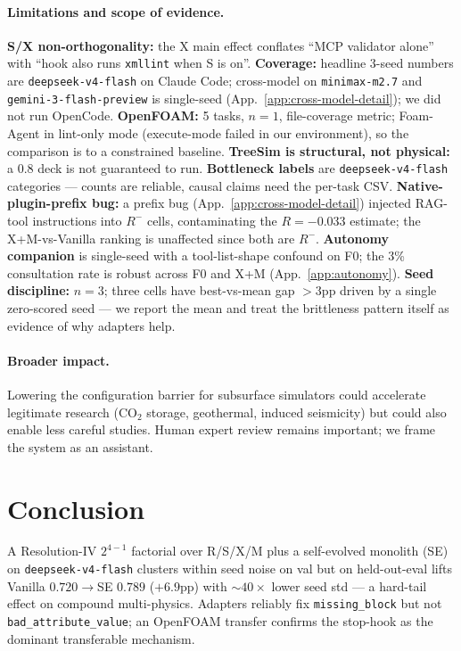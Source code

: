 \documentclass{article}
\begin{document}
\paragraph{Limitations and scope of evidence.} \textbf{S/X non-orthogonality:} the $\mathrm{X}$ main effect conflates ``MCP validator alone'' with ``hook also runs \texttt{xmllint} when S is on''. \textbf{Coverage:} headline 3-seed numbers are \texttt{deepseek-v4-flash} on Claude Code; cross-model on \texttt{minimax-m2.7} and \texttt{gemini-3-flash-preview} is single-seed (App.~\ref{app:cross-model-detail}); we did not run OpenCode. \textbf{OpenFOAM:} 5 tasks, $n=1$, file-coverage metric; Foam-Agent in lint-only mode (execute-mode failed in our environment), so the comparison is to a constrained baseline. \textbf{TreeSim is structural, not physical:} a 0.8 deck is not guaranteed to run. \textbf{Bottleneck labels} are \texttt{deepseek-v4-flash} categories — counts are reliable, causal claims need the per-task CSV. \textbf{Native-plugin-prefix bug:} a prefix bug (App.~\ref{app:cross-model-detail}) injected RAG-tool instructions into $R^{-}$ cells, contaminating the $R=-0.033$ estimate; the X+M-vs-Vanilla ranking is unaffected since both are $R^{-}$. \textbf{Autonomy companion} is single-seed with a tool-list-shape confound on F0; the 3\% consultation rate is robust across F0 and X+M (App.~\ref{app:autonomy}). \textbf{Seed discipline:} $n=3$; three cells have best-vs-mean gap $>3$pp driven by a single zero-scored seed --- we report the mean and treat the brittleness pattern itself as evidence of why adapters help.

\paragraph{Broader impact.} Lowering the configuration barrier for subsurface simulators could accelerate legitimate research (CO$_2$ storage, geothermal, induced seismicity) but could also enable less careful studies. Human expert review remains important; we frame the system as an assistant.


\section{Conclusion}
\label{sec:conclusion}

A Resolution-IV $2^{4-1}$ factorial over R/S/X/M plus a self-evolved monolith (SE) on \texttt{deepseek-v4-flash} clusters within seed noise on val but on held-out-eval lifts Vanilla $0.720{\to}$SE $0.789$ ($+6.9$pp) with $\sim\!40\times$ lower seed std --- a hard-tail effect on compound multi-physics. Adapters reliably fix \texttt{missing\_block} but not \texttt{bad\_attribute\_value}; an OpenFOAM transfer confirms the stop-hook as the dominant transferable mechanism.
\end{document}
